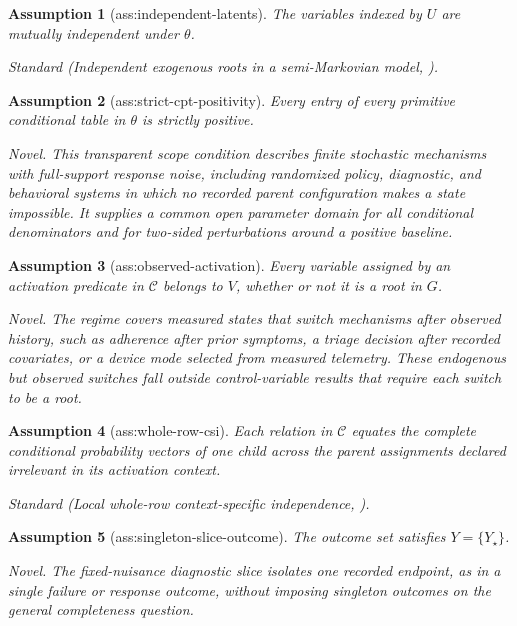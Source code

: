 \documentclass{article}
\newtheorem{assumption}{Assumption}
\begin{document}
\begin{assumption}[ass:independent-latents]\label{ass:independent-latents}
The variables indexed by \(U\) are mutually independent under \(\theta\).
\par\smallskip\noindent\emph{Standard} (Independent exogenous roots in a semi-Markovian model, \cite{ShpitserPearl2006JointInterventional}).
\end{assumption}

\begin{assumption}[ass:strict-cpt-positivity]\label{ass:strict-cpt-positivity}
Every entry of every primitive conditional table in \(\theta\) is strictly positive.
\par\smallskip\noindent\emph{Novel.} This transparent scope condition describes finite stochastic mechanisms with full-support response noise, including randomized policy, diagnostic, and behavioral systems in which no recorded parent configuration makes a state impossible. It supplies a common open parameter domain for all conditional denominators and for two-sided perturbations around a positive baseline.
\end{assumption}

\begin{assumption}[ass:observed-activation]\label{ass:observed-activation}
Every variable assigned by an activation predicate in \(\mathcal C\) belongs to \(V\), whether or not it is a root in \(G\).
\par\smallskip\noindent\emph{Novel.} The regime covers measured states that switch mechanisms after observed history, such as adherence after prior symptoms, a triage decision after recorded covariates, or a device mode selected from measured telemetry. These endogenous but observed switches fall outside control-variable results that require each switch to be a root.
\end{assumption}

\begin{assumption}[ass:whole-row-csi]\label{ass:whole-row-csi}
Each relation in \(\mathcal C\) equates the complete conditional probability vectors of one child across the parent assignments declared irrelevant in its activation context.
\par\smallskip\noindent\emph{Standard} (Local whole-row context-specific independence, \cite{BoutilierFriedmanGoldszmidtKoller1996CSI}).
\end{assumption}

\begin{assumption}[ass:singleton-slice-outcome]\label{ass:singleton-slice-outcome}
The outcome set satisfies \(Y=\{Y_{\star}\}\).
\par\smallskip\noindent\emph{Novel.} The fixed-nuisance diagnostic slice isolates one recorded endpoint, as in a single failure or response outcome, without imposing singleton outcomes on the general completeness question.
\end{assumption}
\end{document}
